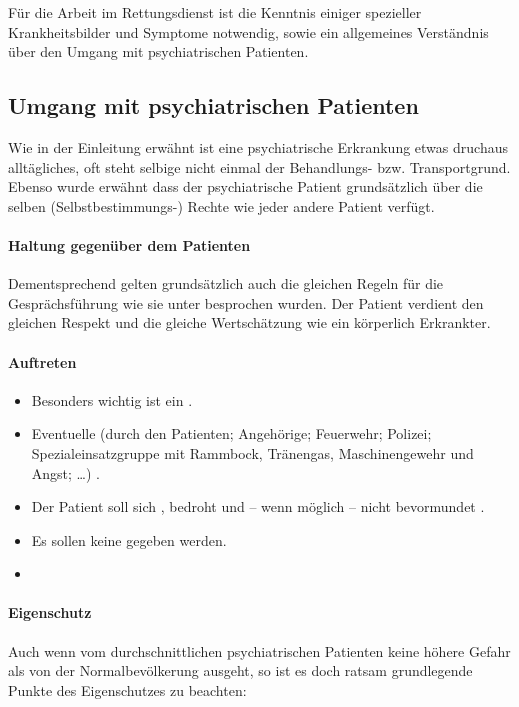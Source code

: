 Für die Arbeit im Rettungsdienst ist die Kenntnis einiger
spezieller Krankheitsbilder und Symptome notwendig, sowie
ein allgemeines Verständnis über den Umgang mit
psychiatrischen Patienten.

\subsection{Umgang mit psychiatrischen Patienten}

Wie in der Einleitung erwähnt ist eine psychiatrische
Erkrankung etwas druchaus alltägliches, oft steht selbige
nicht einmal der Behandlungs- bzw. Transportgrund. Ebenso
wurde erwähnt dass der psychiatrische Patient
grundsätzlich über die selben (Selbstbestimmungs-) Rechte
wie jeder andere Patient verfügt. 

\paragraph{Haltung gegenüber dem Patienten} Dementsprechend
gelten grundsätzlich auch die gleichen Regeln für die Gesprächsführung wie sie unter
 besprochen wurden. Der
Patient verdient den gleichen Respekt und die gleiche
Wertschätzung wie ein körperlich Erkrankter.

\paragraph{Auftreten} 

\begin{itemize}
    \item Besonders wichtig ist ein .
    \item  Eventuelle  (durch den
    Patienten; Angehörige; Feuerwehr; Polizei;
    Spezialeinsatzgruppe mit Rammbock, Tränengas,
    Maschinengewehr und Angst; \ldots) .
    \item Der Patient soll sich ,
    bedroht und -- wenn möglich -- nicht bevormundet
    .
    \item Es sollen keine  gegeben werden. 
   \item {}
\end{itemize}

\paragraph{Eigenschutz} Auch wenn vom durchschnittlichen
psychiatrischen Patienten keine höhere Gefahr als von der
Normalbevölkerung ausgeht, so ist es doch ratsam
grundlegende Punkte des Eigenschutzes zu beachten:


